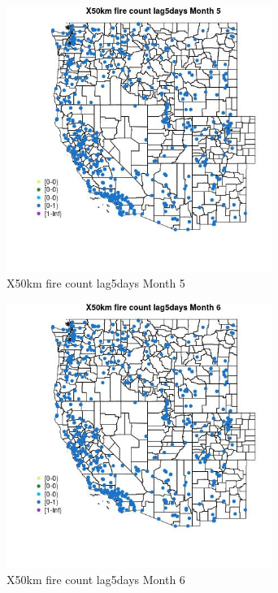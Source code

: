 \begin{figure} 
\centering  
\includegraphics[width=0.77\textwidth]{Code_Outputs/Report_ML_input_PM25_Step4_part_e_de_duplicated_aves_compiled_2019-05-14wNAs_MapObsMo5X50km_fire_count_lag5days.jpg} 
\caption{\label{fig:Report_ML_input_PM25_Step4_part_e_de_duplicated_aves_compiled_2019-05-14wNAsMapObsMo5X50km_fire_count_lag5days}X50km fire count lag5days Month 5} 
\end{figure} 
 

\begin{figure} 
\centering  
\includegraphics[width=0.77\textwidth]{Code_Outputs/Report_ML_input_PM25_Step4_part_e_de_duplicated_aves_compiled_2019-05-14wNAs_MapObsMo6X50km_fire_count_lag5days.jpg} 
\caption{\label{fig:Report_ML_input_PM25_Step4_part_e_de_duplicated_aves_compiled_2019-05-14wNAsMapObsMo6X50km_fire_count_lag5days}X50km fire count lag5days Month 6} 
\end{figure} 
 

